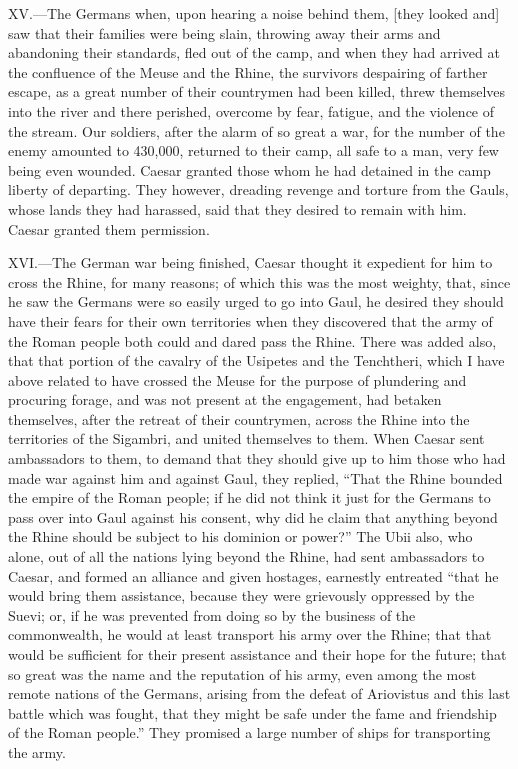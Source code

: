 XV.—The Germans when, upon hearing a noise behind them, [they looked
and] saw that their families were being slain, throwing away their arms
and abandoning their standards, fled out of the camp, and when they had
arrived at the confluence of the Meuse and the Rhine, the survivors
despairing of farther escape, as a great number of their countrymen had
been killed, threw themselves into the river and there perished,
overcome by fear, fatigue, and the violence of the stream. Our soldiers,
after the alarm of so great a war, for the number of the enemy amounted
to 430,000, returned to their camp, all safe to a man, very few being
even wounded. Caesar granted those whom he had detained in the camp
liberty of departing. They however, dreading revenge and torture from
the Gauls, whose lands they had harassed, said that they desired to
remain with him. Caesar granted them permission.

XVI.—The German war being finished, Caesar thought it expedient for him
to cross the Rhine, for many reasons; of which this was the most
weighty, that, since he saw the Germans were so easily urged to go into
Gaul, he desired they should have their fears for their own territories
when they discovered that the army of the Roman people both could and
dared pass the Rhine. There was added also, that that portion of the
cavalry of the Usipetes and the Tenchtheri, which I have above related
to have crossed the Meuse for the purpose of plundering and procuring
forage, and was not present at the engagement, had betaken themselves,
after the retreat of their countrymen, across the Rhine into the
territories of the Sigambri, and united themselves to them. When Caesar
sent ambassadors to them, to demand that they should give up to him
those who had made war against him and against Gaul, they replied, ``That
the Rhine bounded the empire of the Roman people; if he did not think it
just for the Germans to pass over into Gaul against his consent, why did
he claim that anything beyond the Rhine should be subject to his
dominion or power?'' The Ubii also, who alone, out of all the nations
lying beyond the Rhine, had sent ambassadors to Caesar, and formed an
alliance and given hostages, earnestly entreated ``that he would bring
them assistance, because they were grievously oppressed by the Suevi;
or, if he was prevented from doing so by the business of the
commonwealth, he would at least transport his army over the Rhine; that
that would be sufficient for their present assistance and their hope for
the future; that so great was the name and the reputation of his army,
even among the most remote nations of the Germans, arising from the
defeat of Ariovistus and this last battle which was fought, that they
might be safe under the fame and friendship of the Roman people.'' They
promised a large number of ships for transporting the army.

